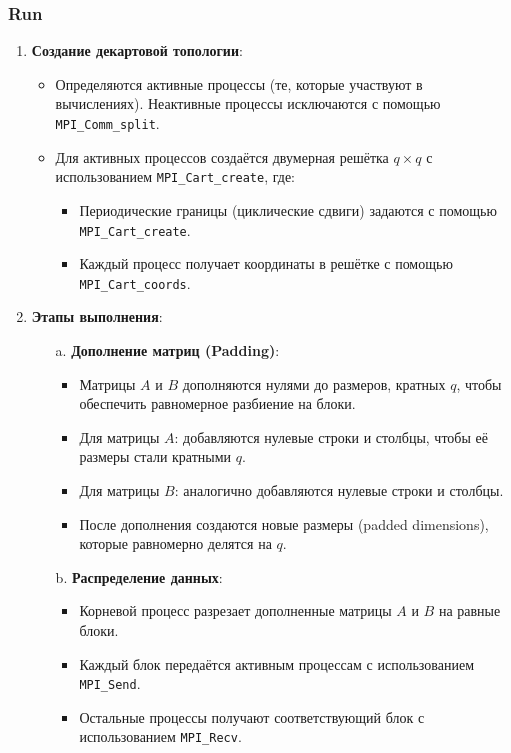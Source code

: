 \documentclass[12pt]{article}
\begin{document}
\subsubsection*{Run}

\begin{enumerate}
    \item \textbf{Создание декартовой топологии}:
    \begin{itemize}
        \item Определяются активные процессы (те, которые участвуют в вычислениях). Неактивные процессы исключаются с помощью \texttt{MPI\_Comm\_split}.
        \item Для активных процессов создаётся двумерная решётка $q \times q$ с использованием \texttt{MPI\_Cart\_create}, где:
        \begin{itemize}
            \item Периодические границы (циклические сдвиги) задаются с помощью \texttt{MPI\_Cart\_create}.
            \item Каждый процесс получает координаты в решётке с помощью \texttt{MPI\_Cart\_coords}.
        \end{itemize}
    \end{itemize}

    \item \textbf{Этапы выполнения}:
    \begin{enumerate}
        \item[a.] \textbf{Дополнение матриц (Padding)}:
        \begin{itemize}
            \item Матрицы $A$ и $B$ дополняются нулями до размеров, кратных $q$, чтобы обеспечить равномерное разбиение на блоки.
            \item Для матрицы $A$: добавляются нулевые строки и столбцы, чтобы её размеры стали кратными $q$.
            \item Для матрицы $B$: аналогично добавляются нулевые строки и столбцы.
            \item После дополнения создаются новые размеры (padded dimensions), которые равномерно делятся на $q$.
        \end{itemize}

        \item[b.] \textbf{Распределение данных}:
        \begin{itemize}
            \item Корневой процесс разрезает дополненные матрицы $A$ и $B$ на равные блоки.
            \item Каждый блок передаётся активным процессам с использованием \texttt{MPI\_Send}.
            \item Остальные процессы получают соответствующий блок с использованием \texttt{MPI\_Recv}.
        \end{itemize}


\end{enumerate}
\end{enumerate}
\end{document}

